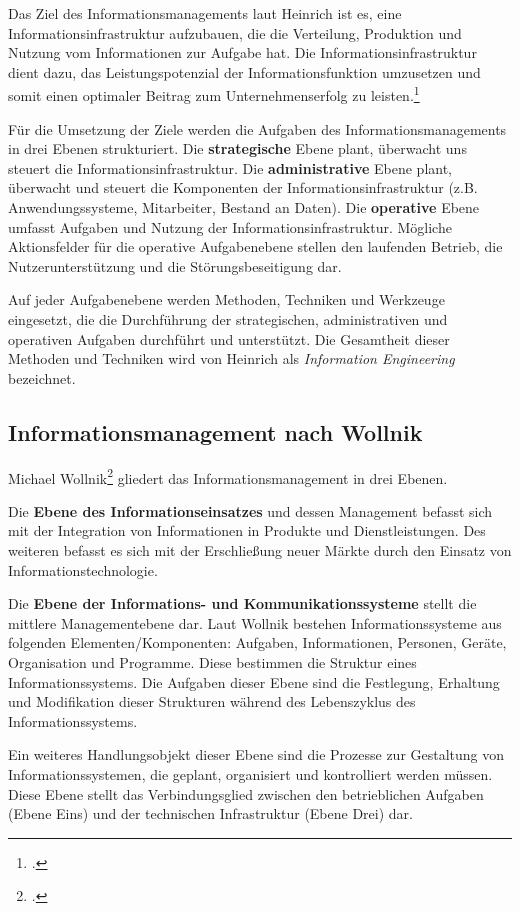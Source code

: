 Das Ziel des Informationsmanagements laut Heinrich ist es, eine Informationsinfrastruktur aufzubauen, die die Verteilung, Produktion und Nutzung vom Informationen zur Aufgabe hat. Die Informationsinfrastruktur dient dazu, das Leistungspotenzial der Informationsfunktion umzusetzen und somit einen optimaler Beitrag zum Unternehmenserfolg zu leisten.\footcite{heinrich_inm_2002}

Für die Umsetzung der Ziele werden die Aufgaben des Informationsmanagements in drei Ebenen strukturiert.
Die \textbf{strategische} Ebene plant, überwacht uns steuert die Informationsinfrastruktur.
Die \textbf{administrative} Ebene plant, überwacht und steuert die Komponenten der Informationsinfrastruktur (z.B. Anwendungssysteme, Mitarbeiter, Bestand an Daten).
Die \textbf{operative} Ebene umfasst Aufgaben und Nutzung der Informationsinfrastruktur. Mögliche Aktionsfelder für die operative Aufgabenebene stellen den laufenden Betrieb, die Nutzerunterstützung und die Störungsbeseitigung dar.

Auf jeder Aufgabenebene werden Methoden, Techniken und Werkzeuge eingesetzt, die die Durchführung 
der strategischen, administrativen und operativen Aufgaben durchführt und unterstützt.
Die Gesamtheit dieser Methoden und Techniken wird von Heinrich als \emph{Information Engineering} bezeichnet.

\subsection{Informationsmanagement nach Wollnik}
Michael Wollnik\footcite[Vgl.][]{wollnik_referenzmodell_1988} gliedert das Informationsmanagement in drei Ebenen.

Die \textbf{Ebene des Informationseinsatzes} und dessen Management befasst sich mit der Integration von Informationen in Produkte und Dienstleistungen. Des weiteren befasst es sich mit der Erschließung neuer Märkte durch den Einsatz von Informationstechnologie.

Die \textbf{Ebene der Informations- und Kommunikationssysteme} stellt die mittlere Managementebene dar. Laut Wollnik bestehen Informationssysteme aus folgenden Elementen/Komponenten: Aufgaben, Informationen, Personen, Geräte, Organisation und Programme. Diese bestimmen die Struktur eines Informationssystems. Die Aufgaben dieser Ebene sind die Festlegung, Erhaltung und Modifikation dieser Strukturen während des Lebenszyklus des Informationssystems.

Ein weiteres Handlungsobjekt dieser Ebene sind die Prozesse zur Gestaltung von Informationssystemen, die geplant, organisiert und kontrolliert werden müssen. Diese Ebene stellt das Verbindungsglied zwischen den betrieblichen Aufgaben (Ebene Eins) und der technischen Infrastruktur (Ebene Drei) dar.

